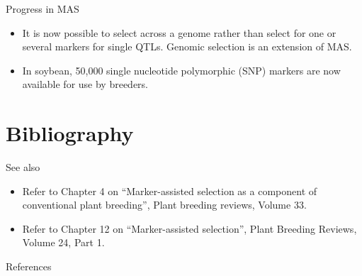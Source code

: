 \documentclass[
  ignorenonframetext,
  aspectratio=169]{beamer}
\newif\ifbibliography
\providecommand{\tightlist}{%
  \setlength{\itemsep}{0pt}\setlength{\parskip}{0pt}}
\begin{document}
\begin{frame}{Progress in MAS}
\protect\hypertarget{progress-in-mas}{}
\begin{itemize}
\tightlist
\item
  It is now possible to select across a genome rather than select for
  one or several markers for single QTLs. Genomic selection is an
  extension of MAS.
\item
  In soybean, 50,000 single nucleotide polymorphic (SNP) markers are now
  available for use by breeders.
\end{itemize}
\end{frame}

\hypertarget{bibliography}{%
\section{Bibliography}\label{bibliography}}

\begin{frame}{See also}
\protect\hypertarget{see-also}{}
\begin{itemize}
\tightlist
\item
  Refer to Chapter 4 on ``Marker-assisted selection as a component of
  conventional plant breeding'', Plant breeding reviews, Volume 33.
\item
  Refer to Chapter 12 on ``Marker-assisted selection'', Plant Breeding
  Reviews, Volume 24, Part 1.
\end{itemize}
\end{frame}

\begin{frame}{References}
\protect\hypertarget{references}{}
\end{frame}

\begin{frame}[allowframebreaks]{}
  \bibliographytrue
  
\end{frame}
\end{document}

